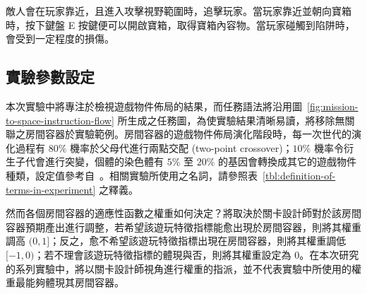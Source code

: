 敵人會在玩家靠近，且進入攻擊視野範圍時，追擊玩家。當玩家靠近並朝向寶箱時，按下鍵盤 E 按鍵便可以開啟寶箱，取得寶箱內容物。當玩家碰觸到陷阱時，會受到一定程度的損傷。







\subsection{實驗參數設定}
\label{ssec:experiment-parameters}

本次實驗中將專注於檢視遊戲物件佈局的結果，而任務語法將沿用圖~\ref{fig:mission-to-space-instruction-flow} 所生成之任務圖，為使實驗結果清晰易讀，將移除無關聯之房間容器於實驗範例。房間容器的遊戲物件佈局演化階段時，每一次世代的演化過程有 $80\%$ 機率於父母代進行兩點交配 (two-point crossover)；$10\%$ 機率令衍生子代會進行突變，個體的染色體有 $5\%$ 至 $20\%$ 的基因會轉換成其它的遊戲物件種類，設定值參考自~\cite{liapis2017multi}。相關實驗所使用之名詞，請參照表~\ref{tbl:definition-of-terms-in-experiment} 之釋義。

然而各個房間容器的適應性函數之權重如何決定？將取決於關卡設計師對於該房間容器預期產出進行調整，若希望該遊玩特徵指標能愈出現於房間容器，則將其權重調高 $(0, 1]$；反之，愈不希望該遊玩特徵指標出現在房間容器，則將其權重調低 $[-1, 0)$；若不理會該遊玩特徵指標的體現與否，則將其權重設定為 $0$。在本次研究的系列實驗中，將以關卡設計師視角進行權重的指派，並不代表實驗中所使用的權重最能夠體現其房間容器。

